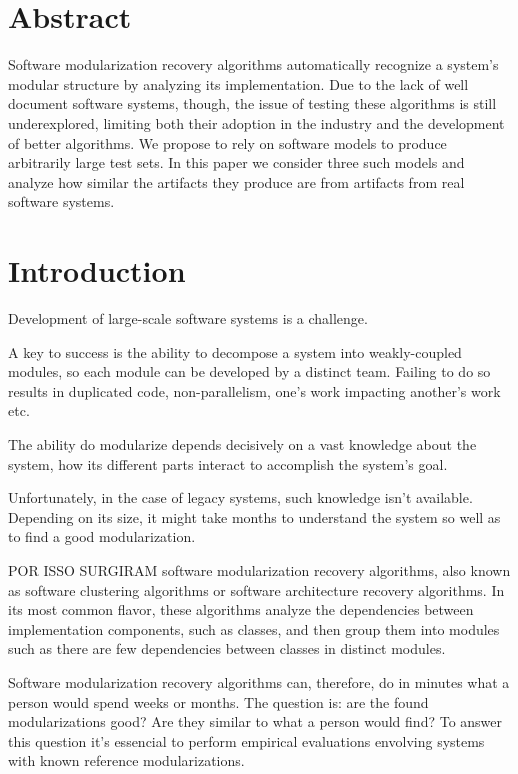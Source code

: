 \section{Abstract}

Software modularization recovery algorithms automatically recognize a system's
modular structure by analyzing its implementation.
Due to the lack of well document software systems, though, the issue of testing
these algorithms is still underexplored, limiting both their adoption in the
industry and the development of better algorithms.
We propose to rely on software models to produce arbitrarily large test sets. In
this paper we consider three such models and analyze how similar the artifacts
they produce are from artifacts from real software systems.

\section{Introduction}

Development of large-scale software systems is a challenge.

A key to success is the ability to decompose a system into weakly-coupled
modules, so each module can be developed by a distinct team. Failing to do so
results in duplicated code, non-parallelism, one's work impacting another's work
etc.

The ability do modularize depends decisively on a vast knowledge about the
system, how its different parts interact to accomplish the system's goal.

Unfortunately, in the case of legacy systems, such knowledge isn't available.
Depending on its size, it might take months to understand the system so well as
to find a good modularization. %

POR ISSO SURGIRAM software modularization recovery algorithms, also known as
software clustering algorithms or software architecture recovery algorithms. In
its most common flavor, these algorithms analyze the dependencies between
implementation components, such as classes, and then group them into modules
such as there are few dependencies between classes in distinct modules.

Software modularization recovery algorithms can, therefore, do in minutes what a
person would spend weeks or months. The question is: are the found
modularizations good? Are they similar to what a person would find? To answer
this question it's essencial to perform empirical evaluations envolving systems
with known reference modularizations.

